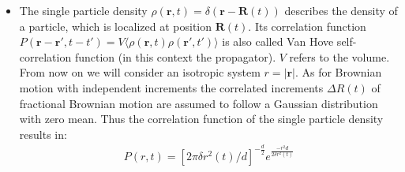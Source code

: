 \documentclass[
  a4paper,BCOR10mm,oneside,
  bibtotoc,idxtotoc,
  headsepline,footsepline,%
  fleqn,openbib
]{scrbook}
\begin{document}
\begin{itemize}
 \item The single particle density $\rho(\bm{r},t)=\delta(\bm{r}-\bm{R}(t))$ describes the density of a particle, which is localized at position $\bm{R}(t)$. Its correlation function $P(\bm{r}-\bm{r}',t-t')= V\langle\rho(\bm{r},t) \rho(\bm{r}',t')\rangle$ is also called Van Hove self-correlation function (in this context the propagator). $V$ refers to the volume. From now on we will consider an isotropic system $ r= |\bm{r}|$. As for Brownian motion with independent increments the correlated increments  $\Delta R(t)$ of fractional Brownian motion are assumed to follow a Gaussian distribution with zero mean. Thus the correlation function of the single particle density results in:
\begin{align}
 P(r,t)=[2 \pi \delta r^{2}(t)/d]^{-\frac{d}{2}} e^{ \frac{-r^2 d}{2 \delta r^{2}(t) }}
\end{align}


\end{itemize}
\end{document}
